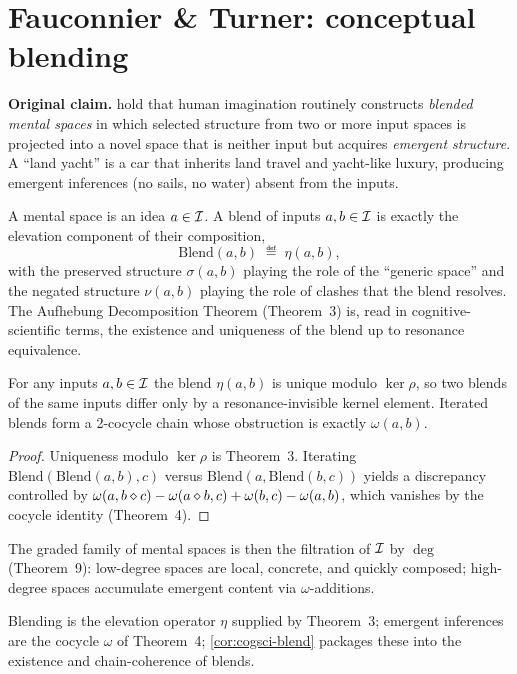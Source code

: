 \section{Fauconnier \& Turner: conceptual blending}\label{sec:cogsci-blending}

\textbf{Original claim.} \citet{FauconnierTurner2002} hold that human
imagination routinely constructs \emph{blended mental spaces} in which
selected structure from two or more input spaces is projected into a novel
space that is neither input but acquires \emph{emergent structure}. A
``land yacht'' is a car that inherits land travel and yacht-like luxury,
producing emergent inferences (no sails, no water) absent from the inputs.

\formalclaim A mental space is an idea $a\in\mathcal{I}$. A blend of inputs
$a,b\in\mathcal{I}$ is exactly the elevation component of their composition,
\[
  \mathrm{Blend}(a,b)\;\eqdef\;\eta(a,b),
\]
with the preserved structure $\sigma(a,b)$ playing the role of the
``generic space'' and the negated structure $\nu(a,b)$ playing the role of
clashes that the blend resolves. The Aufhebung Decomposition Theorem
(Theorem~3) is, read in cognitive-scientific terms, the existence and
uniqueness of the blend up to resonance equivalence.

\begin{corollary}\label{cor:cogsci-blend}
For any inputs $a,b\in\mathcal{I}$ the blend $\eta(a,b)$ is unique modulo
$\ker\rho$, so two blends of the same inputs differ only by a
resonance-invisible kernel element. Iterated blends form a 2-cocycle
chain whose obstruction is exactly $\omega(a,b)$.
\end{corollary}

\begin{proof}
Uniqueness modulo $\ker\rho$ is Theorem~3. Iterating
$\mathrm{Blend}(\mathrm{Blend}(a,b),c)$ versus
$\mathrm{Blend}(a,\mathrm{Blend}(b,c))$ yields a discrepancy controlled by
$\omega(a,b\mathbin{\diamond} c)-\omega(a\mathbin{\diamond} b,c)+\omega(b,c)-\omega(a,b)$,
which vanishes by the cocycle identity (Theorem~4). \qedhere
\end{proof}

The graded family of mental spaces is then the filtration of $\mathcal{I}$ by
$\deg$ (Theorem~9): low-degree spaces are local, concrete, and quickly
composed; high-degree spaces accumulate emergent content via
$\omega$-additions.

\formalstatus Blending is the elevation operator $\eta$ supplied by
Theorem~3; emergent inferences are the cocycle $\omega$ of Theorem~4;
\cref{cor:cogsci-blend} packages these into the existence and
chain-coherence of blends.

